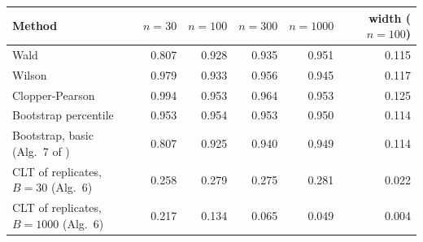 \begin{tabular}{lrrrrr}\toprule
Method & $n=30$ & $n=100$ & $n=300$ & $n=1000$ & width ($n{=}100$)\\\midrule
Wald & 0.807 & 0.928 & 0.935 & 0.951 & 0.115\\
Wilson & 0.979 & 0.933 & 0.956 & 0.945 & 0.117\\
Clopper-Pearson & 0.994 & 0.953 & 0.964 & 0.953 & 0.125\\
Bootstrap percentile & 0.953 & 0.954 & 0.953 & 0.950 & 0.114\\
Bootstrap, basic (Alg.~7 of \cite{almohamad2024}) & 0.807 & 0.925 & 0.940 & 0.949 & 0.114\\
CLT of replicates, $B=30$ (Alg.~6) & 0.258 & 0.279 & 0.275 & 0.281 & 0.022\\
CLT of replicates, $B=1000$ (Alg.~6) & 0.217 & 0.134 & 0.065 & 0.049 & 0.004\\
\bottomrule\end{tabular}
